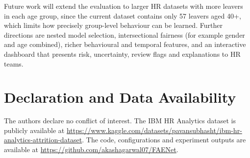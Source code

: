 \documentclass[conference]{IEEEtran}
\begin{document}
Future work will extend the evaluation to larger HR datasets with more leavers in each age group, since the current dataset contains only 57 leavers aged 40+, which limits how precisely group-level behaviour can be learned. Further directions are nested model selection, intersectional fairness (for example gender and age combined), richer behavioural and temporal features, and an interactive dashboard that presents risk, uncertainty, review flags and explanations to HR teams.

\section*{Declaration and Data Availability}
The authors declare no conflict of interest. The IBM HR Analytics dataset is publicly available at \url{https://www.kaggle.com/datasets/pavansubhasht/ibm-hr-analytics-attrition-dataset}. The code, configurations and experiment outputs are available at \url{https://github.com/akashagarwal07/FAENet}.

\FloatBarrier


\end{document}
